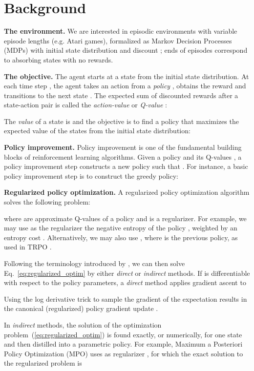\documentclass{article}
\begin{document}
\section{Background}\label{background}

\textbf{The environment.}
We are interested in episodic environments with variable episode lengths (e.g. Atari games), formalized as Markov Decision Processes (MDPs) with initial state distribution  and discount ; ends of episodes correspond to absorbing states with no rewards.

\textbf{The objective.}
The agent starts at a state  from the initial state distribution. At each time step , the agent takes an action  from a \emph{policy} , obtains the reward  and transitions to the next state . The expected sum of discounted rewards after a state-action pair is called the \emph{action-value} or \emph{Q-value} :

The \emph{value} of a state  is 
and the objective is to find a policy  that maximizes the expected value of the states from the initial state distribution:


\textbf{Policy improvement.}
Policy improvement is one of the fundamental building blocks of reinforcement learning algorithms.
Given a  policy  and its Q-values , a policy improvement step constructs a new policy  such that . For instance, a basic policy improvement step is to construct the greedy policy:


\textbf{Regularized policy optimization.}
A regularized policy optimization algorithm solves the following problem:

where  are approximate Q-values of a  policy and  is a regularizer. For example, we may use as the regularizer the negative entropy of the policy , weighted by an entropy cost  \citep{WilliamsAndPeng}. Alternatively, we may also use , where  is the previous policy, as used in TRPO \citep{schulman2015trust}.

Following the terminology introduced by \citet{vieillard2020}, we can then solve Eq.~\ref{eq:regularized_optim} by either \emph{direct} or \emph{indirect} methods. If  is differentiable with respect to the policy parameters,
a \emph{direct} method applies gradient ascent to

Using the log derivative trick to sample the gradient of the expectation results in the canonical (regularized) policy gradient update \citep{sutton2000}. 

\label{sec:mpo}
In \emph{indirect} methods, the solution of the optimization problem~(\ref{eq:regularized_optim}) is found exactly, or numerically, for one state and then distilled into a parametric policy. For example, Maximum a Posteriori Policy Optimization (MPO) \citep{abdolmaleki2018maximum} uses as regularizer , for which the exact solution to the regularized problem is
\end{document}
